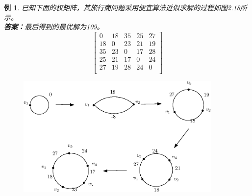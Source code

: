\documentclass[11pt,a4paper,openany]{book}
\newtheorem{sample}{\textbf{例}}[section]
\begin{document}
\begin{sample}\K
已知下面的权矩阵，其旅行商问题采用便宜算法近似求解的过程如图2.18所示。\\
\textbf{答案：}最后得到的最优解为109。
$$\left[
  \begin{array}{ccccc}
    0  & 18 & 35 & 25 & 27 \\
    18 & 0 & 23 & 21 & 19 \\
    35 & 23 & 0 & 17 & 28 \\
    25 & 21 & 17 & 0 & 24 \\
    27 & 19 & 28 & 24 & 0 \\
  \end{array}
\right]$$
\begin{figure}[H]
  \centering
  \includegraphics[width=0.9\textwidth]{2_19.eps}
  \caption{}
\end{figure}

\end{sample}
\end{document}
